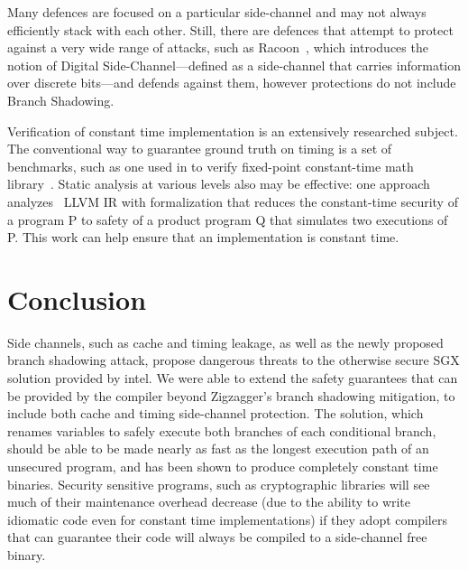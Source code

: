 \documentclass[sigplan, review]{acmart}
\begin{document}
Many defences are focused on a particular side-channel and may not always efficiently stack with each other. Still, there are defences that attempt to protect against a very wide range of attacks, such as Racoon~\cite{rane2015raccoon}, which introduces the notion of Digital Side-Channel---defined as a side-channel that carries information over discrete bits---and defends against them, however protections do not include Branch Shadowing.

Verification of constant time implementation is an extensively researched subject. The conventional way to guarantee ground truth on timing is a set of benchmarks, such as one used in to verify fixed-point constant-time math library~\cite{andrysco2015subnormal}. Static analysis at various levels also may be effective: one approach analyzes~\cite{almeida2016verifying} LLVM IR with formalization that reduces the constant-time security of a program P to safety of a product program Q that simulates two executions of P. This work can help ensure that an implementation is constant time.

\section{Conclusion}
Side channels, such as cache and timing leakage, as well as the newly proposed branch shadowing attack, propose dangerous threats to the otherwise secure SGX solution provided by intel. We were able to extend the safety guarantees that can be provided by the compiler beyond Zigzagger's branch shadowing mitigation, to include both cache and timing side-channel protection. The solution, which renames variables to safely execute both branches of each conditional branch, should be able to be made nearly as fast as the longest execution path of an unsecured program, and has been shown to produce completely constant time binaries. Security sensitive programs, such as cryptographic libraries will see much of their maintenance overhead decrease (due to the ability to write idiomatic code even for constant time implementations) if they adopt compilers that can guarantee their code will always be compiled to a side-channel free binary.


{
}
\end{document}
